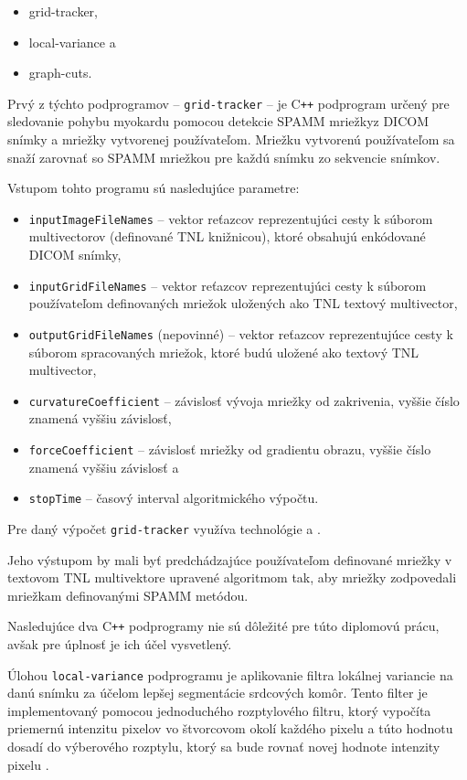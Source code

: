 \begin {itemize}
\item {grid-tracker,}
\item {local-variance a}
\item {graph-cuts.}
\end {itemize}

Prvý z týchto podprogramov -- \texttt{grid-tracker} -- je C\texttt{++} podprogram určený pre sledovanie pohybu myokardu pomocou detekcie SPAMM mriežky\newline z DICOM snímky a mriežky vytvorenej používateľom. Mriežku vytvorenú používateľom sa snaží zarovnať so SPAMM mriežkou pre každú snímku zo sekvencie snímkov.

Vstupom tohto programu sú nasledujúce parametre:
\begin {itemize}
\item {\texttt{inputImageFileNames} -- vektor reťazcov reprezentujúci cesty k súborom multivectorov (definované TNL knižnicou), ktoré obsahujú enkódované DICOM snímky,}
\item {\texttt{inputGridFileNames} -- vektor reťazcov reprezentujúci cesty k súborom používateľom definovaných mriežok uložených ako TNL textový multivector,}
\item {\texttt{outputGridFileNames} (nepovinné) -- vektor reťazcov reprezentujúce cesty k súborom spracovaných mriežok, ktoré budú uložené ako textový TNL multivector,}
\item {\texttt{curvatureCoefficient} -- závislosť vývoja mriežky od zakrivenia, vyššie číslo znamená vyššiu závislosť,}
\item {\texttt{forceCoefficient} -- závislosť mriežky od gradientu obrazu, vyššie číslo znamená vyššiu závislosť a}
\item {\texttt{stopTime} -- časový interval algoritmického výpočtu.}
\end {itemize}

Pre daný výpočet \texttt{grid-tracker} využíva technológie  a .

Jeho výstupom by mali byť predchádzajúce používateľom definované mriežky v textovom TNL multivektore upravené algoritmom tak, aby mriežky zodpovedali mriežkam definovanými SPAMM metódou.

Nasledujúce dva C\texttt{++} podprogramy nie sú dôležité pre túto diplomovú prácu, avšak pre úplnosť je ich účel vysvetlený.

Úlohou \texttt{local-variance} podprogramu je aplikovanie filtra lokálnej variancie na danú snímku za účelom lepšej segmentácie srdcových komôr. Tento filter je implementovaný pomocou jednoduchého rozptylového filtru, ktorý vypočíta priemernú intenzitu pixelov vo štvorcovom okolí každého pixelu a túto hodnotu dosadí do výberového rozptylu, ktorý sa bude rovnať novej hodnote intenzity pixelu \cite{master_thesis_app}.

